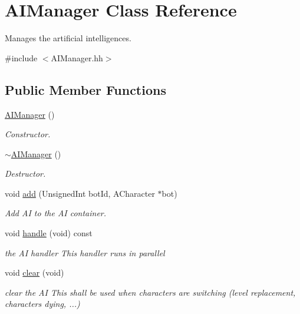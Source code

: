\hypertarget{classAIManager}{}\section{A\+I\+Manager Class Reference}
\label{classAIManager}


Manages the artificial intelligences.  




{\ttfamily \#include $<$A\+I\+Manager.\+hh$>$}

\subsection*{Public Member Functions}
\begin{DoxyCompactItemize}
\item 
\mbox{\label{classAIManager_a02d9effe0270bd2a353acdf45f11b360}} 
\hyperlink{classAIManager_a02d9effe0270bd2a353acdf45f11b360}{A\+I\+Manager} ()
\begin{DoxyCompactList}\small\item\em Constructor. \end{DoxyCompactList}\item 
\mbox{\label{classAIManager_a07762cbbf5de6bffd7499f86987a8dd5}} 
\hyperlink{classAIManager_a07762cbbf5de6bffd7499f86987a8dd5}{$\sim$\+A\+I\+Manager} ()
\begin{DoxyCompactList}\small\item\em Destructor. \end{DoxyCompactList}\item 
void \hyperlink{classAIManager_a4722a3719db2ff5ee2f754b539ee2c17}{add} (Unsigned\+Int bot\+Id, A\+Character $\ast$bot)
\begin{DoxyCompactList}\small\item\em Add AI to the AI container. \end{DoxyCompactList}\item 
\mbox{\label{classAIManager_aeb412f42b60c126594377d739440b632}} 
void \hyperlink{classAIManager_aeb412f42b60c126594377d739440b632}{handle} (void) const
\begin{DoxyCompactList}\small\item\em the AI handler This handler runs in parallel \end{DoxyCompactList}\item 
\mbox{\label{classAIManager_a332f87ed903a2437cb9694bd79fd593e}} 
void \hyperlink{classAIManager_a332f87ed903a2437cb9694bd79fd593e}{clear} (void)
\begin{DoxyCompactList}\small\item\em clear the AI This shall be used when characters are switching (level replacement, characters dying, ...) \end{DoxyCompactList}\end{DoxyCompactItemize}


